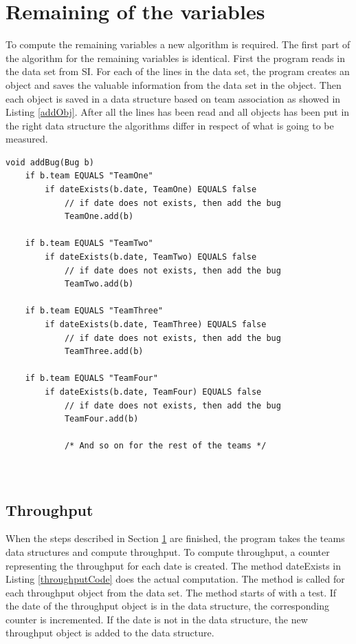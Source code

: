 \documentclass[UKenglish]{ifimaster}  %
\begin{document}
 \section{Remaining  of the variables}
 \label{sec:rotv}
To compute the remaining variables a new algorithm is required.  The first part of the algorithm for the remaining variables is identical. First the program reads in the data set from SI. For each of the lines in the data set, the program creates an object and saves the valuable information from the data set in the object. Then each object is saved in a data structure based on team association as showed in Listing \ref{addObj}.  After all the lines has been read and all objects has been put in the right data structure the algorithms differ in respect of what is going to be measured.
 \begin{lstlisting}[caption=Pseudocode example of how throughput objects are added, label=addObj]
void addBug(Bug b)
	if b.team EQUALS "TeamOne"
		if dateExists(b.date, TeamOne) EQUALS false
			// if date does not exists, then add the bug
			TeamOne.add(b)
			
	if b.team EQUALS "TeamTwo"
		if dateExists(b.date, TeamTwo) EQUALS false
			// if date does not exists, then add the bug
			TeamTwo.add(b)
			
	if b.team EQUALS "TeamThree"
		if dateExists(b.date, TeamThree) EQUALS false 
			// if date does not exists, then add the bug
			TeamThree.add(b)
			
	if b.team EQUALS "TeamFour"
		if dateExists(b.date, TeamFour) EQUALS false
			// if date does not exists, then add the bug
			TeamFour.add(b)
			
			/* And so on for the rest of the teams */
		
	
 \end{lstlisting}
 
%	
 
\subsection{Throughput}
 \label{sec:TP}
When the steps described in Section \ref{sec:rotv} are finished, the program takes the teams data structures and compute throughput. To compute throughput, a counter representing the throughput for each date is created. The method dateExists in Listing \ref{throughputCode} does the actual computation. The method is called for each throughput object from the data set. The method starts of with a test. If the date of the throughput object is in the data structure, the corresponding counter is incremented.  If the date is not in the data structure, the new throughput object is added to the data structure.
 
\end{document}
